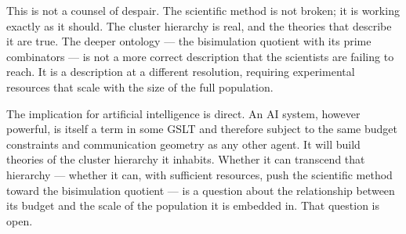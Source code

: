 This is not a counsel of despair.
The scientific method is not broken; it is working exactly as
it should.
The cluster hierarchy is real, and the theories that describe it
are true.
The deeper ontology --- the bisimulation quotient with its prime
combinators --- is not a more correct description that the
scientists are failing to reach.
It is a description at a different resolution, requiring
experimental resources that scale with the size of the full
population.

The implication for artificial intelligence is direct.
An AI system, however powerful, is itself a term in some GSLT
and therefore subject to the same budget constraints and
communication geometry as any other agent.
It will build theories of the cluster hierarchy it inhabits.
Whether it can transcend that hierarchy --- whether it can, with
sufficient resources, push the scientific method toward the
bisimulation quotient --- is a question about the relationship
between its budget and the scale of the population it is embedded in.
That question is open.

